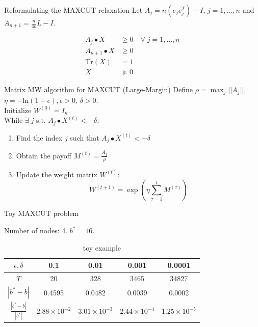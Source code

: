 \documentclass{beamer}
\begin{document}

\begin{frame}{Reformulating the MAXCUT relaxation}
Let $A_j = n(e_je_j^T) - I$, $j = 1, \dots, n$ and $A_{n+1} = \frac{n}{4b} L - I$. 

\begin{align*}
A_j \bullet X &\geq 0 \quad \forall \; j = 1,\ldots,n \\
A_{n+1} \bullet X &\geq 0 \\
\text{Tr}(X) &= 1 \\
X &\succcurlyeq 0
\end{align*}
\end{frame}


\begin{frame}{Matrix MW algorithm for MAXCUT (Large-Margin)}
Define $\rho = \max_j ||A_j||$, $\eta = -\text{ln}(1-\epsilon), \epsilon > 0$, $\delta > 0$. \\ \vspace{.5cm}
Initialize $W^{(0)} = I_n$. \\ \vspace{.5cm}
While $\exists \; j$ s.t. $A_j \bullet X^{(t)} < -\delta$:
\begin{enumerate}
\setlength\itemsep{1.2em}
\item Find the index $j$ such that $A_j \bullet X^{(t)} < -\delta$
\item Obtain the payoff $M^{(t)} = \frac{A_j}{\rho}$
\item Update the weight matrix $W^{(t)}$:
$$ W^{(t+1)} = \exp \left(\eta \sum_{\tau =1}^t M^{(\tau)}\right)$$
\end{enumerate}
\end{frame}


\begin{frame}{Toy MAXCUT problem}

Number of nodes: 4. $b^* = 16$.

\begin{table}[htbp]\label{toytable}
\centering\small
\begin{tabular}{||c|c|c|c|c||}
\hline
$\epsilon, \delta$ & 0.1 & 0.01 & 0.001 & 0.0001 \\
\hline
$T$ & 20 & 328 & 3465  & 34827 \\
\hline
$|b^* - b|$ & 0.4595 & 0.0482 & 0.0039 & 0.0002 \\
\hline
$\frac{|b^* - b|}{|b^*|}$ & $2.88\times 10^{-2}$ &  $3.01\times 10^{-3}$  & $2.44\times 10^{-4}$ &  $1.25\times 10^{-5}$\\
\hline
\end{tabular}
\caption{toy example}
\end{table}


\end{frame}
\end{document}
